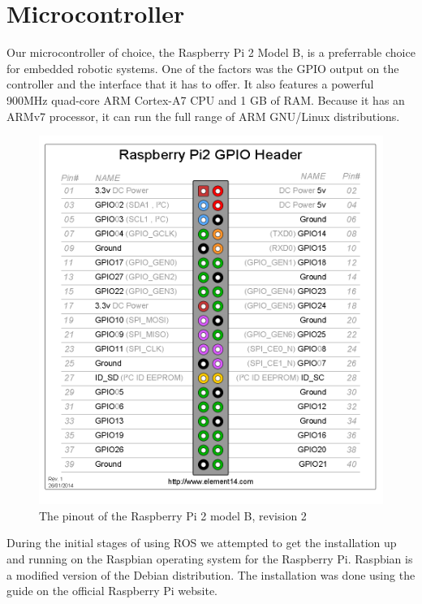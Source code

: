 \section{Microcontroller}

Our microcontroller of choice, the Raspberry Pi 2 Model B, is a preferrable choice for embedded robotic systems. One of the factors was the GPIO output on the controller and the interface that it has to offer. It also features a powerful 900MHz quad-core ARM Cortex-A7 CPU and 1 GB of RAM. Because it has an ARMv7 processor, it can run the full range of ARM GNU/Linux distributions.

\begin{figure}[H]
	\centering
	\includegraphics[scale=.4]{images/GPIO_Pi2.png}
	\caption{The pinout of the Raspberry Pi 2 model B, revision 2}
	\label{fig:gpioraspbi2}
\end{figure}

During the initial stages of using ROS we attempted to get the installation up and running on the Raspbian operating system for the Raspberry Pi. Raspbian is a modified version of the Debian distribution. The installation was done using the guide on the official Raspberry Pi website.

